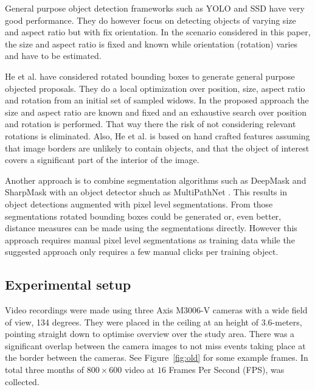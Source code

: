 \documentclass{cta-author}
\begin{document}
General purpose object detection frameworks such as YOLO \cite{DBLP:journals/corr/RedmonDGF15,redmon2016yolo9000} and SSD \cite{liu2016ssd} have very good performance. They do however focus on detecting objects of varying size and aspect ratio but with fix orientation. In the scenario considered in this paper, the size and aspect ratio is fixed and known while orientation (rotation) varies and have to be estimated. 

He et al. \cite{He_2015_ICCV} have considered rotated bounding boxes to generate general purpose objected proposals. They do a local optimization over position, size, aspect ratio and rotation from an initial set of sampled widows. In the proposed approach the size and aspect ratio are known and fixed and an exhaustive search over position and rotation is performed. That way there the risk of not considering relevant rotations is eliminated. Also, He et al. \cite{He_2015_ICCV}  is based on hand crafted features assuming that image borders are unlikely to contain objects, and that the object of interest covers a significant part of the interior of the image.

Another approach is to combine segmentation algorithms such as
DeepMask \cite{DBLP:journals/corr/PinheiroCD15} and
SharpMask \cite{DBLP:journals/corr/PinheiroLCD16} with an object detector shuch as 
MultiPathNet \cite{DBLP:journals/corr/ZagoruykoLLPGCD16}. This results in object detections augmented with pixel level segmentations. From those segmentations rotated bounding boxes could be generated or, even better, distance measures can be made using the segmentations directly. However this approach requires manual pixel level segmentations as training data while the suggested approach only requires a few manual clicks per training object.

\subsection{Experimental setup}


Video recordings were made using three Axis M3006-V cameras with a wide field of view, 134 degrees. They were placed in the ceiling at an height of $3.6$-meters, pointing straight down to optimise overview over the study area. There was a significant overlap between the camera images to not miss events taking place at the border between the cameras. See Figure~\ref{fig:old} for some example frames. In total three months of $800 \times 600$ video at $16$ Frames Per Second (FPS), was collected.
\end{document}
